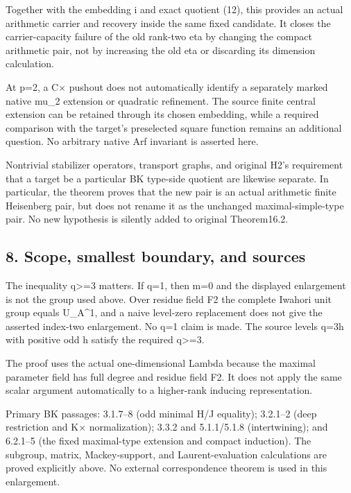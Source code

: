 Together with the embedding i and exact quotient (12), this provides an
actual arithmetic carrier and recovery inside the same fixed candidate.
It closes the carrier-capacity failure of the old rank-two eta by
changing the compact arithmetic pair, not by increasing the old eta or
discarding its dimension calculation.

At p=2, a C× pushout does not automatically identify a separately marked
native mu\_2 extension or quadratic refinement. The source finite
central extension can be retained through its chosen embedding, while a
required comparison with the target's preselected square function
remains an additional question. No arbitrary native Arf invariant is
asserted here.

Nontrivial stabilizer operators, transport graphs, and original H2's
requirement that a target be a particular BK type-side quotient are
likewise separate. In particular, the theorem proves that the new pair
is an actual arithmetic finite Heisenberg pair, but does not rename it
as the unchanged maximal-simple-type pair. No new hypothesis is silently
added to original Theorem16.2.

\hypertarget{rank2-scope-smallest-boundary-and-sources}{%
\subsection{8. Scope, smallest boundary, and
sources}\label{rank2-scope-smallest-boundary-and-sources}}

The inequality q\textgreater=3 matters. If q=1, then m=0 and the
displayed enlargement is not the group used above. Over residue field F2
the complete Iwahori unit group equals U\_A\^{}1, and a naive level-zero
replacement does not give the asserted index-two enlargement. No q=1
claim is made. The source levels q=3h with positive odd h satisfy the
required q\textgreater=3.

The proof uses the actual one-dimensional Lambda because the maximal
parameter field has full degree and residue field F2. It does not apply
the same scalar argument automatically to a higher-rank inducing
representation.

Primary BK passages: 3.1.7--8 (odd minimal H/J equality); 3.2.1--2 (deep
restriction and K× normalization); 3.3.2 and 5.1.1/5.1.8 (intertwining);
and 6.2.1--5 (the fixed maximal-type extension and compact induction).
The subgroup, matrix, Mackey-support, and Laurent-evaluation
calculations are proved explicitly above. No external correspondence
theorem is used in this enlargement.

